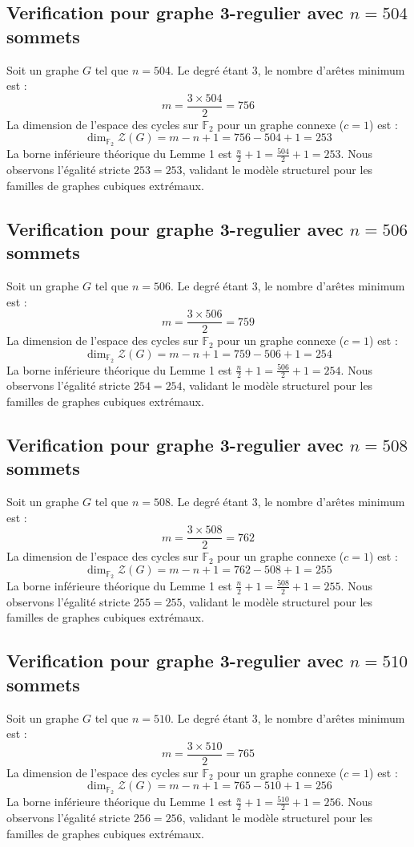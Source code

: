 \documentclass[11pt,a4paper]{article}
\begin{document}
\subsection{Verification pour graphe 3-regulier avec $n=504$ sommets}
Soit un graphe $G$ tel que $n = 504$. Le degré étant 3, le nombre d'arêtes minimum est :
$$ m = \frac{3 \times 504}{2} = 756 $$
La dimension de l'espace des cycles sur $\mathbb{F}_2$ pour un graphe connexe ($c=1$) est :
$$ \dim_{\mathbb{F}_2} \mathcal{Z}(G) = m - n + 1 = 756 - 504 + 1 = 253 $$
La borne inférieure théorique du Lemme 1 est $\frac{n}{2} + 1 = \frac{504}{2} + 1 = 253$.
Nous observons l'égalité stricte $253 = 253$, validant le modèle structurel pour les familles de graphes cubiques extrémaux.

\subsection{Verification pour graphe 3-regulier avec $n=506$ sommets}
Soit un graphe $G$ tel que $n = 506$. Le degré étant 3, le nombre d'arêtes minimum est :
$$ m = \frac{3 \times 506}{2} = 759 $$
La dimension de l'espace des cycles sur $\mathbb{F}_2$ pour un graphe connexe ($c=1$) est :
$$ \dim_{\mathbb{F}_2} \mathcal{Z}(G) = m - n + 1 = 759 - 506 + 1 = 254 $$
La borne inférieure théorique du Lemme 1 est $\frac{n}{2} + 1 = \frac{506}{2} + 1 = 254$.
Nous observons l'égalité stricte $254 = 254$, validant le modèle structurel pour les familles de graphes cubiques extrémaux.

\subsection{Verification pour graphe 3-regulier avec $n=508$ sommets}
Soit un graphe $G$ tel que $n = 508$. Le degré étant 3, le nombre d'arêtes minimum est :
$$ m = \frac{3 \times 508}{2} = 762 $$
La dimension de l'espace des cycles sur $\mathbb{F}_2$ pour un graphe connexe ($c=1$) est :
$$ \dim_{\mathbb{F}_2} \mathcal{Z}(G) = m - n + 1 = 762 - 508 + 1 = 255 $$
La borne inférieure théorique du Lemme 1 est $\frac{n}{2} + 1 = \frac{508}{2} + 1 = 255$.
Nous observons l'égalité stricte $255 = 255$, validant le modèle structurel pour les familles de graphes cubiques extrémaux.

\subsection{Verification pour graphe 3-regulier avec $n=510$ sommets}
Soit un graphe $G$ tel que $n = 510$. Le degré étant 3, le nombre d'arêtes minimum est :
$$ m = \frac{3 \times 510}{2} = 765 $$
La dimension de l'espace des cycles sur $\mathbb{F}_2$ pour un graphe connexe ($c=1$) est :
$$ \dim_{\mathbb{F}_2} \mathcal{Z}(G) = m - n + 1 = 765 - 510 + 1 = 256 $$
La borne inférieure théorique du Lemme 1 est $\frac{n}{2} + 1 = \frac{510}{2} + 1 = 256$.
Nous observons l'égalité stricte $256 = 256$, validant le modèle structurel pour les familles de graphes cubiques extrémaux.
\end{document}
